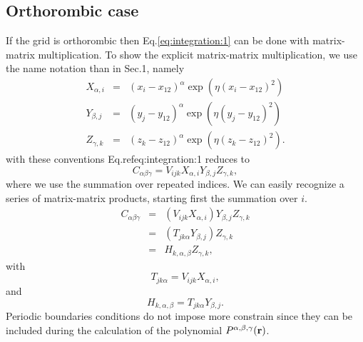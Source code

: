 \documentclass[prb]{revtex4}
\begin{document}
\subsection{Orthorombic case}
If the grid is orthorombic then Eq.\ref{eq:integration:1} can be done with
matrix-matrix multiplication. To show the explicit matrix-matrix multiplication,
we use the name notation than in Sec.1, namely
\begin{eqnarray}
  \label{eq:integrate:2}
  X_{\alpha,i} &=& (x_i -x_{12})^\alpha \exp\left( \eta (x_i -x_{12})^2\right)\\
  Y_{\beta,j} &=& (y_j -y_{12})^\alpha \exp\left( \eta (y_j -y_{12})^2\right)\\
  Z_{\gamma,k} &=& (z_k -z_{12})^\alpha \exp\left( \eta (z_k -z_{12})^2\right).
\end{eqnarray}
with these conventions Eq.ref{eq:integration:1} reduces to
\begin{equation}
  C_{\alpha\beta\gamma} = V_{ijk} X_{\alpha,i} Y_{\beta,j} Z_{\gamma,k},
\end{equation}
where we use the summation over repeated indices. We can easily recognize a
series of matrix-matrix products, starting first the summation over $i$.
\begin{eqnarray}
  \label{eq:integrate:3}
  C_{\alpha\beta\gamma} &=& (V_{ijk} X_{\alpha,i}) Y_{\beta,j} Z_{\gamma,k}\\
  &=& (T_{jk\alpha} Y_{\beta,j}) Z_{\gamma,k}\\
  &=& H_{k,\alpha,\beta} Z_{\gamma,k},
\end{eqnarray}
with
\begin{equation}
  \label{eq:integrate:4}
  T_{jk\alpha} = V_{ijk} X_{\alpha,i},
\end{equation}
and
\begin{equation}
  \label{eq:integrate:5}
  H_{k,\alpha,\beta} = T_{jk\alpha} Y_{\beta,j}.
\end{equation}
Periodic boundaries conditions do not impose more constrain since they can be
included during the calculation of the polynomial $P^{\alpha,\beta,\gamma}({\bf
  r})$.
\end{document}
